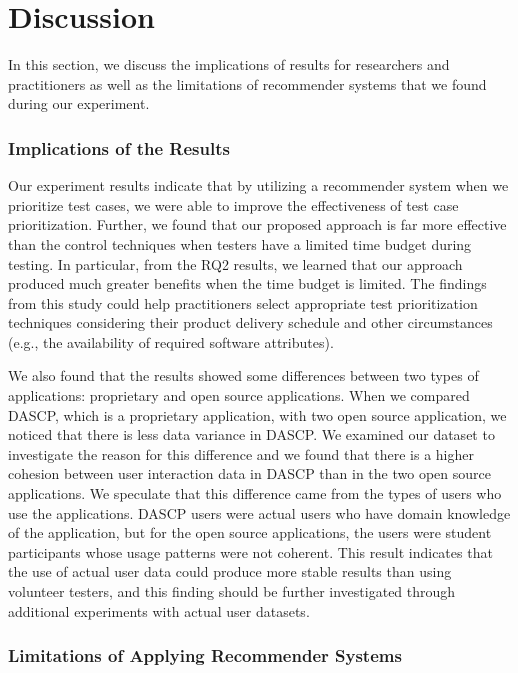\section{Discussion}
\label{sec:discussion}

In this section, we discuss the implications of results for
researchers and practitioners as well as the limitations of
recommender systems that we found during our experiment.

\vspace*{2pt}
\subsubsection*{Implications of the Results}

Our experiment results indicate that by utilizing a recommender system
when we prioritize test cases, we were able to improve the effectiveness 
of test case prioritization. Further, we found that our proposed approach
is far more effective than the control techniques when testers have a 
limited time budget during testing. 
In particular, from the RQ2 results, we learned that our approach produced
much greater benefits when the time budget is limited.
The findings from this study could help practitioners select appropriate {\large }
test prioritization techniques considering their product delivery schedule   
and other circumstances (e.g., the availability of required software attributes). 

We also found that the results showed some differences between two types 
of applications: proprietary and open source applications.
When we compared DASCP, which is a proprietary application, with two  
open source application, we noticed that there is less data variance in DASCP.
We examined our dataset to investigate the reason for this difference 
and we found that there is a higher cohesion between user interaction data
in DASCP than in the two open source applications.
We speculate that this difference came from the types of users who use the applications.
DASCP users were actual users who have domain knowledge of the application, 
but for the open source applications, the users were student participants whose
usage patterns were not coherent.
This result indicates that the use of actual user data could produce more
stable results than using volunteer testers, and this finding should be further 
investigated through additional experiments with actual user datasets. 

\vspace*{2pt}
\subsubsection*{Limitations of Applying Recommender Systems}

